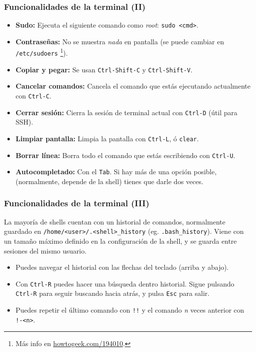 \documentclass[aspectratio=43]{beamer}
\begin{document}
\begin{frame}
    \frametitle{Funcionalidades de la terminal (II)}

    \begin{itemize}
        \item \textbf{Sudo:} Ejecuta el siguiente comando como \textit{root}: \texttt{sudo <cmd>}.
        \item \textbf{Contraseñas:} No se muestra \textit{nada} en pantalla (se puede cambiar en \texttt{/etc/sudoers} \footnote{Más info en \href{https://www.howtogeek.com/194010/how-to-make-password-asterisks-visible-in-the-terminal-window-in-linux/}{howtogeek.com/194010}.}). 
        \item \textbf{Copiar y pegar:} Se usan \texttt{Ctrl-Shift-C} y \texttt{Ctrl-Shift-V}.
        \item \textbf{Cancelar comandos:} Cancela el comando que estás ejecutando actualmente con \texttt{Ctrl-C}.
        \item \textbf{Cerrar sesión:} Cierra la sesión de terminal actual con \texttt{Ctrl-D} (útil para SSH).
        \item \textbf{Limpiar pantalla:} Limpia la pantalla con \texttt{Ctrl-L}, ó \texttt{clear}.
        \item \textbf{Borrar línea:} Borra todo el comando que estás escribiendo con \texttt{Ctrl-U}.
        \item \textbf{Autocompletado:} Con el \texttt{Tab}. Si hay más de una opción posible, (normalmente, depende de la shell) tienes que darle dos veces.
    \end{itemize}

\end{frame}

\begin{frame}
    \frametitle{Funcionalidades de la terminal (III)}
    
    La mayoría de shells cuentan con un historial de comandos, normalmente guardado en \texttt{/home/<user>/.<shell>\_history} (eg. \texttt{.bash\_history}). Viene con un tamaño máximo definido en la configuración de la shell, y se guarda entre sesiones del mismo usuario.
    \begin{itemize}
        \item Puedes navegar el historial con las flechas del teclado (arriba y abajo).
        \item Con \texttt{Ctrl-R} puedes hacer una búsqueda dentro historial. Sigue pulsando \texttt{Ctrl-R} para seguir buscando hacia atrás, y pulsa \texttt{Esc} para salir.
        \item Puedes repetir el último comando con \texttt{!!} y el comando \textit{n} veces anterior con \texttt{!-<n>}.
    \end{itemize}

\end{frame}
\end{document}
